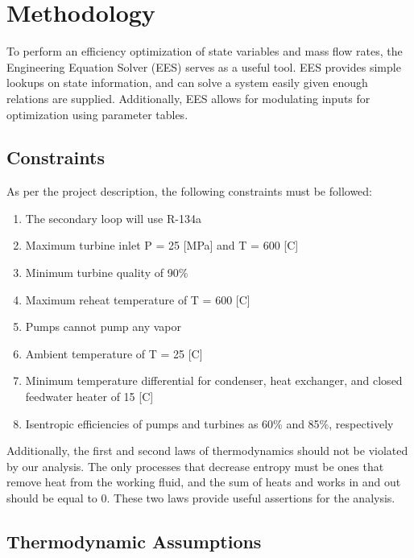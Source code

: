 \documentclass[10pt,cleanfoot]{asme2ej}
\begin{document}

\section{Methodology}

To perform an efficiency optimization of state variables and mass flow rates, the Engineering Equation Solver (EES) serves as a useful tool. EES provides simple lookups on state information, and can solve a system easily given enough relations are supplied. Additionally, EES allows for modulating inputs for optimization using parameter tables.

\subsection{Constraints}

As per the project description, the following constraints must be followed:

\begin{enumerate}
\item
The secondary loop will use R-134a
\item
Maximum turbine inlet P = 25 [MPa] and T = 600 [C]
\item
Minimum turbine quality of 90\%
\item
Maximum reheat temperature of T = 600 [C]
\item
Pumps cannot pump any vapor
\item
Ambient temperature of T = 25 [C]
\item
Minimum temperature differential for condenser, heat exchanger, and closed feedwater heater of 15 [C]
\item
Isentropic efficiencies of pumps and turbines as 60\% and 85\%, respectively
\end{enumerate}

Additionally, the first and second laws of thermodynamics should not be violated by our analysis. The only processes that decrease entropy must be ones that remove heat from the working fluid, and the sum of heats and works in and out should be equal to 0. These two laws provide useful assertions for the analysis.

\subsection{Thermodynamic Assumptions}
\end{document}
